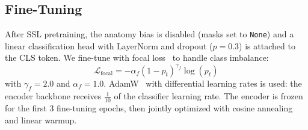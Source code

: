 \subsection{Fine-Tuning}
\label{sec:finetuning}

After SSL pretraining, the anatomy bias is disabled (masks set to \texttt{None}) and a linear classification head with LayerNorm and dropout ($p = 0.3$) is attached to the CLS token. We fine-tune with focal loss~\cite{lin2017focal} to handle class imbalance:
\begin{equation}
\mathcal{L}_{\text{focal}} = -\alpha_f (1 - p_t)^{\gamma_f} \log(p_t)
\label{eq:focal}
\end{equation}
with $\gamma_f = 2.0$ and $\alpha_f = 1.0$. AdamW~\cite{loshchilov2019adamw} with differential learning rates is used: the encoder backbone receives $\frac{1}{10}$ of the classifier learning rate. The encoder is frozen for the first 3 fine-tuning epochs, then jointly optimized with cosine annealing and linear warmup.
